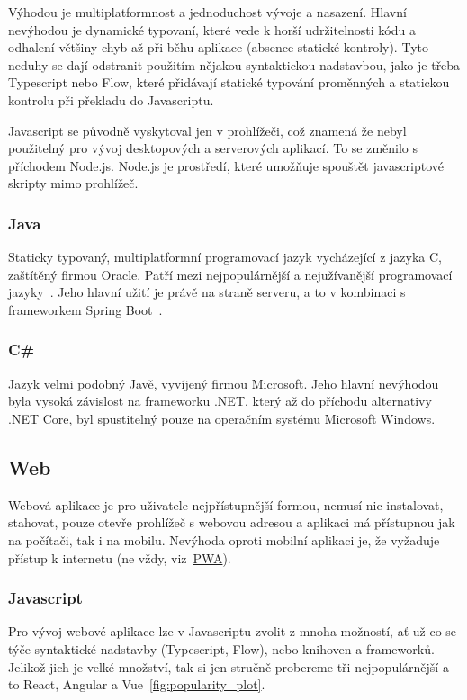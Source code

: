 Výhodou je multiplatformnost a jednoduchost vývoje a nasazení. Hlavní nevýhodou je dynamické typovaní, které vede k horší udržitelnosti kódu a odhalení většiny chyb až při běhu aplikace (absence statické kontroly). Tyto neduhy se dají odstranit použitím nějakou syntaktickou nadstavbou, jako je třeba Typescript nebo Flow, které přidávají statické typování proměnných a statickou kontrolu při překladu do Javascriptu.

Javascript se původně vyskytoval jen v prohlížeči, což znamená že nebyl použitelný pro vývoj desktopových a serverových aplikací. To se změnilo s příchodem Node.js. Node.js je prostředí, které umožňuje spouštět javascriptové skripty mimo prohlížeč.

\subsubsection*{Java}
Staticky typovaný, multiplatformní programovací jazyk vycházející z jazyka C, zaštítěný firmou Oracle. Patří mezi nejpopulárnější a nejužívanější programovací jazyky~\cite{stackexchangeinc_2019_stack}. Jeho hlavní užití je právě na straně serveru, a to v kombinaci s frameworkem Spring Boot~\cite{jetbrainssro_2019_demographics}.

\subsubsection*{C\# }
Jazyk velmi podobný Javě, vyvíjený firmou Microsoft. Jeho hlavní nevýhodou byla vysoká závislost na frameworku .NET, který až do příchodu alternativy .NET Core, byl spustitelný pouze na operačním systému Microsoft Windows.

\subsection{Web}
\label{ss:web}
Webová aplikace je pro uživatele nejpřístupnější formou, nemusí nic instalovat, stahovat, pouze otevře prohlížeč s webovou adresou a aplikaci má přístupnou jak na počítači, tak i na mobilu. Nevýhoda oproti mobilní aplikaci je, že vyžaduje přístup k internetu (ne vždy, viz~\hyperref[sss:pwa]{PWA}).

\subsubsection*{Javascript}
\label{ss:javascript}
Pro vývoj webové aplikace lze v Javascriptu zvolit z mnoha možností, ať už co se týče syntaktické nadstavby (Typescript, Flow), nebo knihoven a frameworků. Jelikož jich je velké množství, tak si jen stručně probereme tři nejpopulárnější a to React, Angular a Vue~\ref{fig:popularity_plot}.

